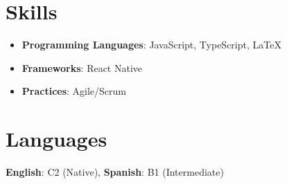 \documentclass{ExpressiveResume}
\begin{document}

\section{Skills}

\begin{itemize}
  \item \textbf{Programming Languages}: JavaScript, TypeScript, \LaTeX
  \item \textbf{Frameworks}: React Native
  \item \textbf{Practices}: Agile/Scrum
\end{itemize}

\section{Languages}
\textbf{English}: C2 (Native), \textbf{Spanish}: B1 (Intermediate)
\end{document}
